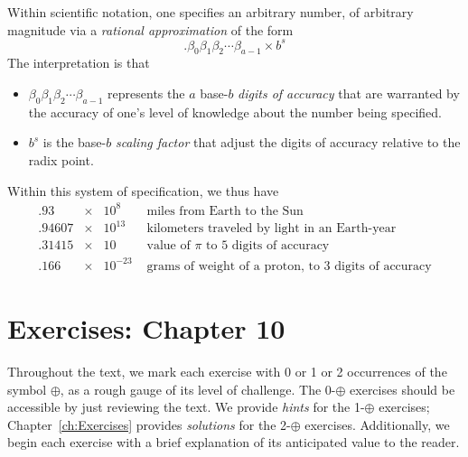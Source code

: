 \medskip

Within scientific notation, one specifies an arbitrary number, of arbitrary magnitude via a {\em rational approximation} of the form
\[ . \beta_0 \beta_1 \beta_2 \cdots \beta_{a-1} \times b^s \]
The interpretation is that
\begin{itemize}
\item
$\beta_0 \beta_1 \beta_2 \cdots \beta_{a-1}$ represents the $a$ base-$b$ {\em digits of accuracy} that are warranted by the accuracy of one's level of knowledge about the number being specified.

\item
$b^s$ is the base-$b$ {\em scaling factor} that adjust the digits of accuracy relative to the radix point.
\end{itemize}
Within this system of specification, we thus have
\[ \begin{array}{lcll}
.93       & \times & 10^8      & \mbox{ miles from Earth to the Sun} \\
.94607 & \times & 10^{13}  & \mbox{ kilometers traveled by light in an Earth-year} \\
.31415 & \times & 10          & \mbox{ value of $\pi$ to $5$ digits of accuracy} \\
.166     & \times & 10^{-23} & \mbox{ grams of weight of a proton, to $3$ digits of accuracy}
\end{array}
\]



\section{Exercises: Chapter 10}

Throughout the text, we mark each exercise with 0 or 1 or 2 occurrences of the symbol $\oplus$, as a rough gauge of its level of challenge.  The 0-$\oplus$ exercises should be accessible by just reviewing the text.  We provide {\em hints} for the 1-$\oplus$ exercises; Chapter~\ref{ch:Exercises} provides {\em solutions} for the 2-$\oplus$ exercises.  Additionally, we begin each exercise with a brief explanation of its anticipated value to the reader. 

